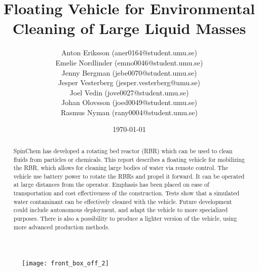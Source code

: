 \documentclass[11pt]{article}
\title{Floating Vehicle for Environmental \\ Cleaning of Large Liquid Masses}
\author{Anton Eriksson (aner0164@student.umu.se) \\
  Emelie Nordlinder (emno0046@student.umu.se) \\
  Jenny Bergman (jebe0070@student.umu.se) \\
  Jesper Vesterberg (jesper.vesterberg@umu.se) \\
  Joel Vedin (jove0027@student.umu.se) \\
  Johan Olovsson (joed0049@student.umu.se) \\
Rasmus Nyman (rany0004@student.umu.se)}
\date{\today}
\begin{document}
\begin{titlepage}
  \maketitle
  \thispagestyle{fancy}
  \rhead{\today}

\begin{figure}[H]
   \centering
   \texttt{[image: front\_box\_off\_2]}
   \label{fig:controller_front}
\end{figure}

  \begin{abstract}
    \noindent
    SpinChem\textsuperscript{\textregistered} has developed a rotating bed reactor (RBR) which can be used to
    clean fluids from particles or chemicals. This report describes a floating
    vehicle for mobilizing the RBR, which allows for cleaning large bodies of
    water via remote control. The vehicle use battery power to rotate the RBRs and propel it forward. It can be operated at large distances from the
    operator. Emphasis has been placed on ease of transportation and cost
    effectiveness of the construction. Tests show that a simulated water
    contaminant can be effectively cleaned with the vehicle. Future development
    could include autonomous deployment, and adapt the vehicle to more specialized purposes. There is also a possibility
    to produce a lighter version of the vehicle, using more advanced
    production methods.
  \end{abstract}

\end{titlepage}

\lhead{\thetitle}
\rhead{\today}
\cfoot{\thepage}


\clearpage

\tableofcontents
\clearpage


\clearpage

\clearpage

\clearpage

\clearpage

\clearpage

\clearpage

\clearpage

\clearpage
\end{document}
